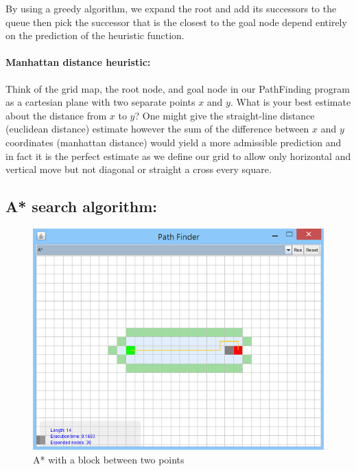 \documentclass[a4paper]{article}
\begin{document}
By using a greedy algorithm, we expand the root and add its successors to the queue then pick the successor that is the closest to the goal node depend entirely on the prediction of the heuristic function.

\paragraph{Manhattan distance heuristic: } Think of the grid map, the root node, and goal node in our PathFinding program as a cartesian plane with two separate points $x$ and $y$. What is your best estimate about the distance from $x$ to $y$? One might give the straight-line distance (euclidean distance) estimate however the sum of the difference between $x$ and $y$ coordinates (manhattan distance) would yield a more admissible prediction and in fact it is the perfect estimate as we define our grid to allow only horizontal and vertical move but not diagonal or straight a cross every square.  


\subsection{A* search algorithm:}

\begin{figure}[h!]
  \centering
    \includegraphics[scale=.9]{images/A1.png}
  \caption{A* with a block between two points}
\end{figure}
\end{document}

